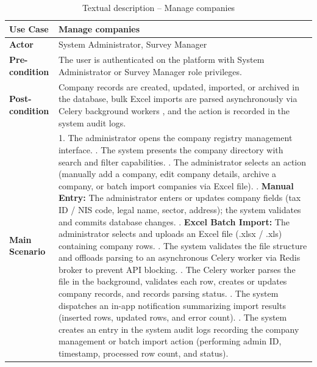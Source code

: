 \documentclass[12pt,a4paper]{report}
\begin{document}
\begin{table}[H]
\centering
\caption{Textual description -- Manage companies}
\label{tab:refinement_manage_companies}
\vspace{0.2cm}
\small
\renewcommand{\arraystretch}{1.15}
\begin{tabular}{|p{3.5cm}|p{12.0cm}|}
\hline
\textbf{Use Case} & Manage companies \\ \hline
\textbf{Actor} & System Administrator, Survey Manager \\ \hline
\textbf{Pre-condition} & The user is authenticated on the platform with System Administrator or Survey Manager role privileges. \\ \hline
\textbf{Post-condition} & Company records are created, updated, imported, or archived in the database, bulk Excel imports are parsed asynchronously via Celery background workers \cite{celery}, and the action is recorded in the system audit logs. \\ \hline
\textbf{Main Scenario} & 
1. The administrator opens the company registry management interface. \newline
2. The system presents the company directory with search and filter capabilities. \newline
3. The administrator selects an action (manually add a company, edit company details, archive a company, or batch import companies via Excel file). \newline
4. \textbf{Manual Entry:} The administrator enters or updates company fields (tax ID / NIS code, legal name, sector, address); the system validates and commits database changes. \newline
5. \textbf{Excel Batch Import:} The administrator selects and uploads an Excel file (.xlsx / .xls) containing company rows. \newline
6. The system validates the file structure and offloads parsing to an asynchronous Celery worker \cite{celery} via Redis broker \cite{redis} to prevent API blocking. \newline
7. The Celery worker parses the file in the background, validates each row, creates or updates company records, and records parsing status. \newline
8. The system dispatches an in-app notification summarizing import results (inserted rows, updated rows, and error count). \newline
9. The system creates an entry in the system audit logs recording the company management or batch import action (performing admin ID, timestamp, processed row count, and status). \newline

\end{tabular}
\end{table}
\end{document}
